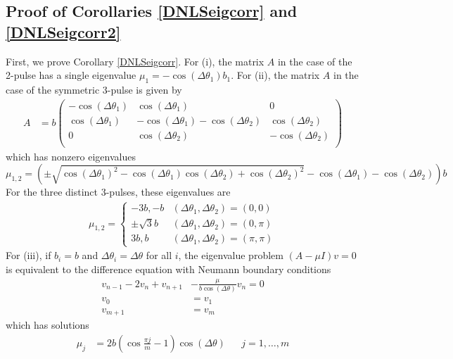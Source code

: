 \documentclass[12pt]{elsarticle}
\begin{document}
\subsection{Proof of Corollaries \ref{DNLSeigcorr} and \ref{DNLSeigcorr2}}

First, we prove Corollary \ref{DNLSeigcorr}. For (i), the matrix $A$ in the case of the 2-pulse has a single eigenvalue $\mu_1 = -\cos(\Delta\theta_1) b_1$. For (ii), the matrix $A$ in the case of the symmetric 3-pulse is given by
\begin{align*}
A &= b \begin{pmatrix}
-\cos(\Delta\theta_1) & \cos(\Delta\theta_1) & 0  \\
\cos(\Delta\theta_1) & -\cos(\Delta\theta_1) - \cos(\Delta\theta_2) & \cos(\Delta\theta_2) \\ 
0 & \cos(\Delta\theta_2) & -\cos(\Delta\theta_2) \\
\end{pmatrix}
\end{align*}
which has nonzero eigenvalues
\[
\mu_{1, 2} = \left( \pm\sqrt{\cos(\Delta\theta_1)^2 - \cos(\Delta\theta_1) \cos(\Delta\theta_2) + \cos(\Delta\theta_2)^2} - \cos(\Delta\theta_1) - \cos(\Delta\theta_2) \right)b
\]
For the three distinct 3-pulses, these eigenvalues are
\begin{align*}
\mu_{1, 2} = \begin{cases}
-3b, -b & (\Delta\theta_1, \Delta\theta_2) = (0, 0) \\
\pm \sqrt{3}b & (\Delta\theta_1, \Delta\theta_2) = (0, \pi) \\
3b, b & (\Delta\theta_1, \Delta\theta_2) = (\pi, \pi)
\end{cases}
\end{align*}
For (iii), if $b_i = b$ and $\Delta\theta_i = \Delta\theta$ for all $i$, the eigenvalue problem $(A - \mu I)v = 0$ is equivalent to the difference equation with Neumann boundary conditions
\begin{equation*}
\begin{aligned}
v_{n-1} - 2 v_n + v_{n+1} &- \frac{\mu}{b \cos(\Delta\theta)} v_n = 0 \\
v_0 &= v_1 \\
v_{m+1} &= v_m
\end{aligned}
\end{equation*}
which has solutions
\begin{align*}
\mu_j &= 2 b \left( \cos\frac{\pi j}{m} - 1 \right) \cos (\Delta\theta) && j = 1, \dots, m
\end{align*}
\end{document}
